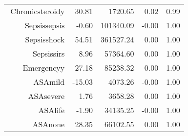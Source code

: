\begin{tabular}{rrrrr}
$$  Chronic\-steroid\-y & 30.81 & 1720.65 & 0.02 & 0.99 \\ 
  Sepsis\-sepsis & -0.60 & 101340.09 & -0.00 & 1.00 \\ 
  Sepsis\-shock & 54.51 & 361527.24 & 0.00 & 1.00 \\ 
  Sepsis\-sirs & 8.96 & 57364.60 & 0.00 & 1.00 \\ 
  Emergency\-y & 27.18 & 85238.32 & 0.00 & 1.00 \\ 
  ASA\-mild & -15.03 & 4073.26 & -0.00 & 1.00 \\ 
  ASA\-severe & 1.76 & 3658.28 & 0.00 & 1.00 \\ 
  ASA\-life & -1.90 & 34135.25 & -0.00 & 1.00 \\ 
  ASA\-none & 28.35 & 66102.55 & 0.00 & 1.00 \\ 
   \hline
\end{tabular}

